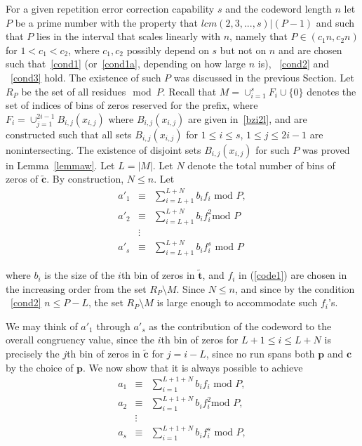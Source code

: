For a given repetition error correction capability $s$ and the
codeword length $n$ let $P$ be a prime number with the property that
$lcm(2,3,...,s)| (P-1)$ and such that $P$ lies in the interval that
scales linearly with $n$, namely that $P \in (c_1n,c_2n)$ for $1
<c_1 < c_2$, where $c_1,c_2$ possibly depend on $s$ but not on $n$
and are chosen such that~\eqref{cond1} (or~\eqref{cond1a}, depending
on how large $n$ is), ~\eqref{cond2} and ~\eqref{cond3} hold. The
existence of such $P$ was discussed in the previous Section. Let
$R_P$ be the set of all residues$\mod P$. Recall that
$M=\cup_{i=1}^s F_i \cup \{0\}$ denotes the set of indices of bins
of zeros reserved for the prefix, where $F_i = \cup_{j=1}^{2i-1}
B_{i,j}(x_{i,j})$ where $B_{i,j}(x_{i,j})$ are given
in~\eqref{bzi2l}, and are constructed such that all sets
$B_{i,j}(x_{i,j})$ for $1 \leq i \leq s$, $1 \leq j \leq 2i-1$ are
nonintersecting. The existence of disjoint sets $B_{i,j}(x_{i,j})$
for such $P$ was proved in Lemma~\ref{lemmaw}. Let $L=|M|$. Let $N$
denote the total number of bins of zeros of $\tilde{\mathbf{c}}$. By
construction, $N \leq n$.
 Let
\begin{equation}\label{code1}\begin{array}{ccc} {a'}_1 &\equiv& \sum_{i=L+1}^{L+N} b_i f_i
\text{ mod } P, \\ {a'}_2 &\equiv& \sum_{i=L+1}^{L+N} b_i f_i^2
\text{
mod } P\\ &\vdots& \\
{a'}_s &\equiv& \sum_{i=L+1}^{L+N} b_i f_i^s \text{ mod }
P\end{array}\end{equation}

where $b_i$ is the size of the $i$th bin of zeros in
$\tilde{\mathbf{t}}$, and $f_i$ in (\ref{code1}) are chosen in the
increasing order from the set $R_P\setminus M$. Since $N \leq n$,
and since by the condition ~\eqref{cond2}  $n \leq P-L$, the set
$R_P\setminus M$ is large enough to accommodate such $f_i$'s.

We may think of ${a'}_1$ through ${a'}_s$ as the contribution of the
codeword to the overall congruency value, since the $i$th bin of
zeros for $L+1 \leq i \leq L+N$ is precisely the $j$th bin of zeros
in $\tilde{\mathbf{c}}$ for $j=i-L$, since no run spans both
$\mathbf{p}$ and $\mathbf{c}$ by the choice of $\mathbf{p}$. We now
show that it is always possible to achieve
\begin{equation}\label{s1}\begin{array}{ccc} a_1 &\equiv& \sum_{i=1}^{L+1+N} b_i f_i
\text{ mod } P, \\ a_2 &\equiv& \sum_{i=1}^{L+1+N} b_i f_i^2
\text{
mod } P,\\ &\vdots& \\
a_s &\equiv& \sum_{i=1}^{L+1+N} b_i f_i^s \text{ mod }
P,\end{array}\end{equation}

